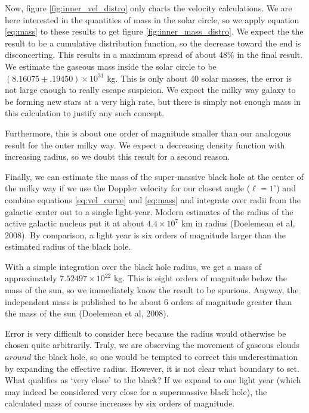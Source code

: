 \documentclass[12pt]{article}
\begin{document}
Now, figure \ref{fig:inner_vel_distro} only charts the velocity calculations. We are here interested in the quantities of mass in the solar circle, so we apply equation \ref{eq:mass} to these results to get figure \ref{fig:inner_mass_distro}. We expect the the result to be a cumulative distribution function, so the decrease toward the end is disconcerting. This results in a maximum spread of about 48\% in the final result. We estimate the gaseous mass inside the solar circle to be $(8.16075 \pm .19450) \times 10^{31}$ kg. This is only about 40 solar masses, the error is not large enough to really escape suspicion. We expect the milky way galaxy to be forming new stars at a very high rate, but there is simply not enough mass in this calculation to justify any such concept.

Furthermore, this is about one order of magnitude smaller than our analogous result for the outer milky way. We expect a decreasing density function with increasing radius, so we doubt this result for a second reason.

Finally, we can estimate the mass of the super-massive black hole at the center of the milky way if we use the Doppler velocity for our closest angle ($\ell = 1^\circ$) and combine equations \ref{eq:vel_curve} and \ref{eq:mass} and integrate over radii from the galactic center out to a single light-year. Modern estimates of the radius of the active galactic nucleus put it at about $4.4 \times 10^{7}$ km in radius (Doelemean et al, 2008). By comparison, a light year is six orders of magnitude larger than the estimated radius of the black hole.

With a simple integration over the black hole radius, we get a mass of approximately $7.52497 \times 10^{22}$ kg. This is eight orders of magnitude below the mass of the sun, so we immediately know the result to be spurious. Anyway, the independent mass is published to be about 6 orders of magnitude greater than the mass of the sun (Doelemean et al, 2008).

Error is very difficult to consider here because the radius would otherwise be chosen quite arbitrarily. Truly, we are observing the movement of gaseous clouds $around$ the black hole, so one would be tempted to correct this underestimation by expanding the effective radius. However, it is not clear what boundary to set. What qualifies as `very close' to the black? If we expand to one light year (which may indeed be considered very close for a supermassive black hole), the calculated mass of course increases by six orders of magnitude.
\end{document}
